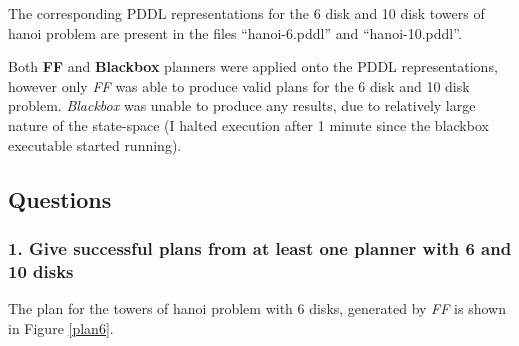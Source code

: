 \documentclass[10pt, letter]{article}
\begin{document}
The corresponding PDDL representations for the 6 disk and 10 disk towers of hanoi problem are present in the files ``hanoi-6.pddl'' and ``hanoi-10.pddl''.

Both \textbf{FF} and \textbf{Blackbox} planners were applied onto the PDDL representations, however only \textit{FF} was able to produce valid plans for the 6 disk and 10 disk problem. \textit{Blackbox} was unable to produce any results, due to relatively large nature of the state-space (I halted execution after 1 minute since the blackbox executable started running).

\subsection{Questions}
\subsubsection*{1. Give successful plans from at least one planner with 6 and 10 disks}
The plan for the towers of hanoi problem with 6 disks, generated by \textit{FF} is shown in Figure \ref{plan6}.
\end{document}
